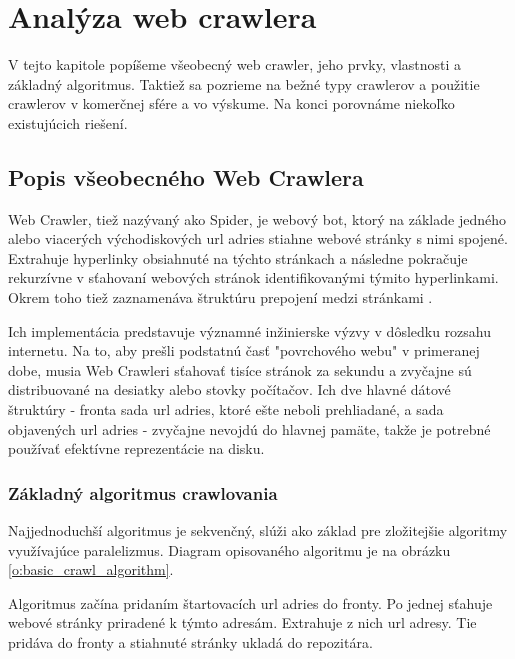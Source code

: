 

\chapter{Analýza web crawlera}
V tejto kapitole popíšeme všeobecný web crawler, jeho prvky, vlastnosti a základný algoritmus. Taktiež sa pozrieme na bežné typy crawlerov a použitie crawlerov v komerčnej sfére a vo výskume. Na konci porovnáme niekoľko existujúcich riešení.

\section{Popis všeobecného Web Crawlera}

Web Crawler, tiež nazývaný ako Spider, je webový bot, ktorý na základe jedného alebo viacerých východiskových \acrshort{url} adries stiahne webové stránky s nimi spojené. Extrahuje hyperlinky obsiahnuté na týchto stránkach a následne pokračuje rekurzívne v sťahovaní webových stránok identifikovanými týmito hyperlinkami. Okrem toho tiež zaznamenáva štruktúru prepojení medzi stránkami \cite{introToInfRetrieval}.

Ich implementácia predstavuje významné inžinierske výzvy v dôsledku rozsahu internetu. Na to, aby prešli podstatnú časť "povrchového webu" v primeranej dobe, musia Web Crawleri sťahovať tisíce stránok za sekundu a zvyčajne sú distribuované na desiatky alebo stovky počítačov. Ich dve hlavné dátové štruktúry - fronta sada \acrshort{url}  adries, ktoré ešte neboli prehliadané, a sada objavených \acrshort{url}  adries - zvyčajne nevojdú do hlavnej pamäte, takže je potrebné používať efektívne reprezentácie na disku. \cite{encykOfDatabases}

\subsection{Základný algoritmus crawlovania}\label{sub:zakladnyAlgoritmusCrawlovania}
Najjednoduchší algoritmus je sekvenčný, slúži ako základ pre zložitejšie algoritmy využívajúce paralelizmus. Diagram opisovaného algoritmu je na obrázku \ref{o:basic_crawl_algorithm}.

Algoritmus začína pridaním štartovacích \acrshort{url}  adries do fronty. Po jednej sťahuje webové stránky priradené k týmto adresám. Extrahuje z nich \acrshort{url}  adresy. Tie pridáva do fronty a stiahnuté stránky ukladá do repozitára.

